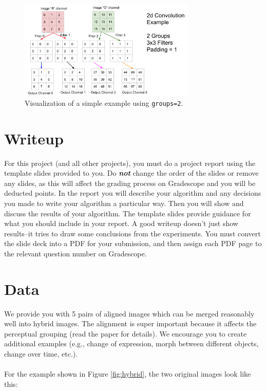 \documentclass{article}
\begin{document}
\begin{figure}[ht]
    \centering
    \includegraphics[width=0.75\textwidth]{images/part3_groups.png}
    \caption{Visualization of a simple example using \lstinline{groups=2}.}
    \label{fig:groups}
\end{figure}


\section{Writeup}
For this project (and all other projects), you must do a project report using the template slides provided to you. Do \textbf{\textit{not}} change the order of the slides or remove any slides, as this will affect the grading process on Gradescope and you will be deducted points. In the report you will describe your algorithm and any decisions you made to write your algorithm a particular way. Then you will show and discuss the results of your algorithm. The template slides provide guidance for what you should include in your report. A good writeup doesn't just show results--it tries to draw some conclusions from the experiments. You must convert the slide deck into a PDF for your submission, and then assign each PDF page to the relevant question number on Gradescope.


\section*{Data}
We provide you with 5 pairs of aligned images which can be merged reasonably well into hybrid images. The alignment is super important because it affects the perceptual grouping (read the paper for details). We encourage you to create additional examples (e.g., change of expression, morph between different objects, change over time, etc.).
\\
\\
For the example shown in Figure \ref{fig:hybrid}, the two original images look like this:
\end{document}
